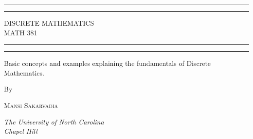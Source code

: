 \documentclass{article}
\begin{document}
\begin{titlepage} %

	\centering %
	
	\scshape %
	
	\vspace*{\baselineskip} %
	
	
	\rule{\textwidth}{1.6pt}\vspace*{-\baselineskip}\vspace*{2pt} %
	\rule{\textwidth}{0.4pt} %
	
	\vspace{0.75\baselineskip} %
	
	{\LARGE DISCRETE MATHEMATICS\\ MATH 381\\} %
	
	\vspace{0.75\baselineskip} %
	
	\rule{\textwidth}{0.4pt}\vspace*{-\baselineskip}\vspace{3.2pt} %
	\rule{\textwidth}{1.6pt} %
	
	\vspace{2\baselineskip} %
	
	
	Basic concepts and examples explaining the fundamentals of Discrete Mathematics. %
	
	\vspace*{3\baselineskip} %
	
	
	By
	
	\vspace{0.5\baselineskip} %
	
	{\scshape\Large Mansi Sakarvadia} %
	
	\vspace{0.5\baselineskip} %
	
	\textit{The University of North Carolina \\ Chapel Hill} %
	
	
\end{titlepage}
\end{document}

